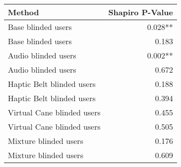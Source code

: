 
\centering
\begin{tabular}{lr}
\toprule
                    Method & Shapiro P-Value \\
\midrule
        Base blinded users &         0.028** \\
        Base blinded users &           0.183 \\
       Audio blinded users &         0.002** \\
       Audio blinded users &           0.672 \\
 Haptic Belt blinded users &           0.188 \\
 Haptic Belt blinded users &           0.394 \\
Virtual Cane blinded users &           0.455 \\
Virtual Cane blinded users &           0.505 \\
     Mixture blinded users &           0.176 \\
     Mixture blinded users &           0.609 \\
\bottomrule
\end{tabular}
